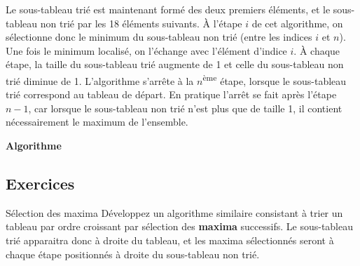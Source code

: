	Le sous-tableau trié est maintenant formé des deux premiers éléments, et
	le sous-tableau non trié par les 18 éléments suivants. À
	l’étape $i$ de cet algorithme, on sélectionne donc le minimum du
	sous-tableau non trié (entre les indices $i$ et $n$). Une
	fois le minimum localisé, on l’échange avec l’élément d’indice
	$i$. À chaque étape, la taille du sous-tableau trié augmente de
	1 et celle du sous-tableau non trié diminue de 1. L’algorithme s’arrête
	à la $n$\textsuperscript{ème} étape, lorsque le sous-tableau
	trié correspond au tableau de départ. En pratique l’arrêt se fait après
	l’étape $n - 1$, car lorsque le sous-tableau non trié n’est plus
	que de taille 1, il contient nécessairement le maximum de l’ensemble.

	{\sffamily\bfseries\upshape
	Algorithme}
	

	\bigskip


	\subsection*{Exercices}

	\begin{Exercice}{Sélection des maxima}
		Développez un algorithme similaire consistant à trier un tableau par
		ordre croissant par sélection des \textbf{maxima} successifs. Le
		sous-tableau trié apparaitra donc à droite du tableau, et les maxima
		sélectionnés seront à chaque étape positionnés à droite du sous-tableau
		non trié. 
	\end{Exercice}
	
